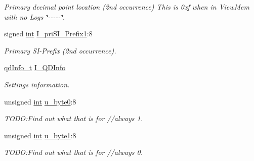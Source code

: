 \begin{DoxyCompactItemize}
\begin{DoxyCompactList}\small\item\em Primary decimal point location (2nd occurrence) This is 0xf when in ViewMem with no Logs \char`\"{}-\/-\/-\/-\/-\/\char`\"{}. \item\end{DoxyCompactList}\item 
\hypertarget{structFluke_1_1Fluke189_1_1cmdr__QD0__t_afbe593e8475da6b924318bdb9b13117f}{
signed \hyperlink{structFluke_1_1Fluke189_1_1cmdr__QD0__t_a6ab6a1621f14f0fe83e89daadd9ba787}{int} \hyperlink{structFluke_1_1Fluke189_1_1cmdr__QD0__t_afbe593e8475da6b924318bdb9b13117f}{I\_\-priSI\_\-Prefix1}:8}
\label{structFluke_1_1Fluke189_1_1cmdr__QD0__t_afbe593e8475da6b924318bdb9b13117f}

\begin{DoxyCompactList}\small\item\em Primary SI-\/Prefix (2nd occurrence). \item\end{DoxyCompactList}\item 
\hypertarget{structFluke_1_1Fluke189_1_1cmdr__QD0__t_a3a8552b047596e62890977125cda5447}{
\hyperlink{structFluke_1_1Fluke189_1_1qdInfo__t}{qdInfo\_\-t} \hyperlink{structFluke_1_1Fluke189_1_1cmdr__QD0__t_a3a8552b047596e62890977125cda5447}{I\_\-QDInfo}}
\label{structFluke_1_1Fluke189_1_1cmdr__QD0__t_a3a8552b047596e62890977125cda5447}

\begin{DoxyCompactList}\small\item\em Settings information. \item\end{DoxyCompactList}\item 
\hypertarget{structFluke_1_1Fluke189_1_1cmdr__QD0__t_a8255c6d6c66768208d4a020146369013}{
unsigned \hyperlink{structFluke_1_1Fluke189_1_1cmdr__QD0__t_a6ab6a1621f14f0fe83e89daadd9ba787}{int} \hyperlink{structFluke_1_1Fluke189_1_1cmdr__QD0__t_a8255c6d6c66768208d4a020146369013}{u\_\-byte0}:8}
\label{structFluke_1_1Fluke189_1_1cmdr__QD0__t_a8255c6d6c66768208d4a020146369013}

\begin{DoxyCompactList}\small\item\em TODO:Find out what that is for //always 1. \item\end{DoxyCompactList}\item 
\hypertarget{structFluke_1_1Fluke189_1_1cmdr__QD0__t_a835768e5aabd53d41e1e7a4d10fdde1f}{
unsigned \hyperlink{structFluke_1_1Fluke189_1_1cmdr__QD0__t_a6ab6a1621f14f0fe83e89daadd9ba787}{int} \hyperlink{structFluke_1_1Fluke189_1_1cmdr__QD0__t_a835768e5aabd53d41e1e7a4d10fdde1f}{u\_\-byte1}:8}
\label{structFluke_1_1Fluke189_1_1cmdr__QD0__t_a835768e5aabd53d41e1e7a4d10fdde1f}

\begin{DoxyCompactList}\small\item\em TODO:Find out what that is for //always 0. \item\end{DoxyCompactList}\end{DoxyCompactItemize}


